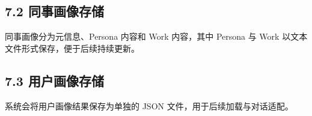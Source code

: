 \documentclass[12pt,a4paper]{article}
\begin{document}
\subsection*{7.2 同事画像存储}
\vspace{0.45em}
同事画像分为元信息、Persona 内容和 Work 内容，其中 Persona 与 Work 以文本文件形式保存，便于后续持续更新。\par
\vspace{0.45em}
\subsection*{7.3 用户画像存储}
\vspace{0.45em}
系统会将用户画像结果保存为单独的 JSON 文件，用于后续加载与对话适配。\par
\vspace{0.45em}
\end{document}
